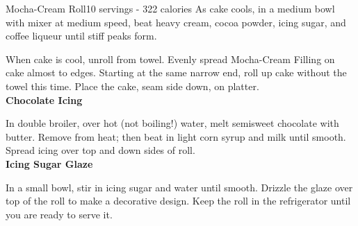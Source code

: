 \begin{recipe}{Mocha-Cream Roll}{10 servings - 322 calories}{}
As cake cools, in a medium bowl with mixer at medium speed, beat heavy cream, cocoa powder, icing sugar, and coffee liqueur until stiff peaks form.

When cake is cool, unroll from towel. Evenly spread Mocha-Cream Filling on cake almost to edges. Starting at the same narrow end, roll up cake without the towel this time. Place the cake, seam side down, on platter.\\

\textbf{Chocolate Icing}

In double broiler, over hot (not boiling!) water, melt semisweet chocolate with butter. Remove from heat; then beat in light corn syrup and milk until smooth. Spread icing over top and down sides of roll.\\

\textbf{Icing Sugar Glaze}

In a small bowl, stir in icing sugar and water until smooth. Drizzle the glaze over top of the roll to make a decorative design. Keep the roll in the refrigerator until you are ready to serve it.

\end{recipe}